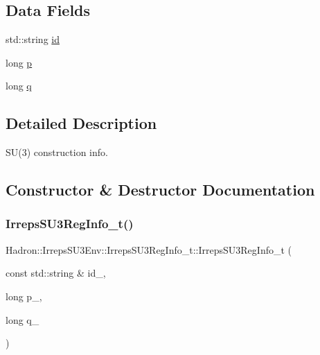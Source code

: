 \subsection*{Data Fields}
\begin{DoxyCompactItemize}
\item 
std\+::string \mbox{\hyperlink{structHadron_1_1IrrepsSU3Env_1_1IrrepsSU3RegInfo__t_a70e0f962edb35da73bed617ac0fddd81}{id}}
\item 
long \mbox{\hyperlink{structHadron_1_1IrrepsSU3Env_1_1IrrepsSU3RegInfo__t_a5ce27a63cc496fb09569691b1efdf0d0}{p}}
\item 
long \mbox{\hyperlink{structHadron_1_1IrrepsSU3Env_1_1IrrepsSU3RegInfo__t_a97db0daa2cc5a119261d02424f4979b6}{q}}
\end{DoxyCompactItemize}


\subsection{Detailed Description}
S\+U(3) construction info. 

\subsection{Constructor \& Destructor Documentation}
\mbox{\label{structHadron_1_1IrrepsSU3Env_1_1IrrepsSU3RegInfo__t_ad3e33486ad0d29745aea8a67a190d58c}} 
\subsubsection{\texorpdfstring{IrrepsSU3RegInfo\_t()}{IrrepsSU3RegInfo\_t()}\hspace{0.1cm}{\footnotesize\ttfamily [1/2]}}
{\footnotesize\ttfamily Hadron\+::\+Irreps\+S\+U3\+Env\+::\+Irreps\+S\+U3\+Reg\+Info\+\_\+t\+::\+Irreps\+S\+U3\+Reg\+Info\+\_\+t (\begin{DoxyParamCaption}\item[{const std\+::string \&}]{id\+\_\+,  }\item[{long}]{p\+\_\+,  }\item[{long}]{q\+\_\+ }\end{DoxyParamCaption})\hspace{0.3cm}{\ttfamily [inline]}}

